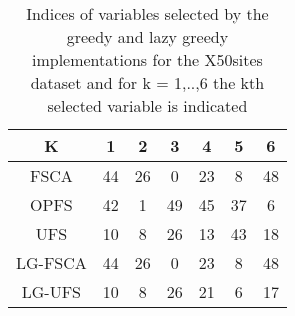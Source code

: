 \begin{table}
	\begin{center}
		\begin{tabular}{c c c c c c c}
			K & 1 & 2 & 3 & 4 & 5 & 6 \\
			\hline
			FSCA & 44 & 26 & 0 & 23 & 8 & 48 \\
			OPFS & 42 & 1 & 49 & 45 & 37 & 6 \\
			UFS & 10 & 8 & 26 & 13 & 43 & 18 \\
			LG-FSCA & 44 & 26 & 0 & 23 & 8 & 48 \\
			LG-UFS & 10 & 8 & 26 & 21 & 6 & 17 \\
		\end{tabular}
	\end{center}
	\caption{Indices of variables selected by the greedy and lazy greedy implementations for the X50sites dataset and for k = 1,..,6 the kth selected variable is indicated}
\end{table}